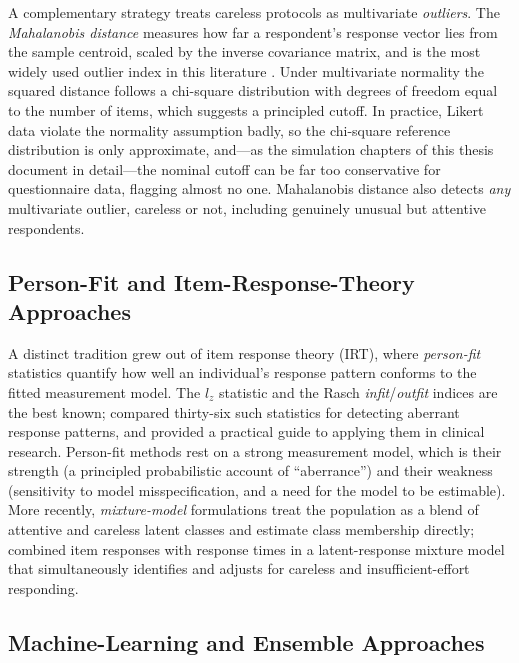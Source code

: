 A complementary strategy treats careless protocols as multivariate
\emph{outliers}. The \emph{Mahalanobis distance} \parencite{mahalanobis1936generalised}
measures how far a respondent's response vector lies from the sample centroid,
scaled by the inverse covariance matrix, and is the most widely used outlier
index in this literature \parencite{meade2012identifying, curran2016methods}.
Under multivariate normality the squared distance follows a chi-square
distribution with degrees of freedom equal to the number of items, which
suggests a principled cutoff. In practice, Likert data violate the normality
assumption badly, so the chi-square reference distribution is only approximate,
and---as the simulation chapters of this thesis document in detail---the
nominal cutoff can be far too conservative for questionnaire data, flagging
almost no one. Mahalanobis distance also detects \emph{any} multivariate
outlier, careless or not, including genuinely unusual but attentive respondents.

\subsection{Person-Fit and Item-Response-Theory Approaches}

A distinct tradition grew out of item response theory (IRT), where
\emph{person-fit} statistics quantify how well an individual's response pattern
conforms to the fitted measurement model. The $l_z$ statistic and the Rasch
\emph{infit}/\emph{outfit} indices are the best known; \textcite{karabatsos2003comparing}
compared thirty-six such statistics for detecting aberrant response patterns,
and \textcite{meijer2016practical} provided a practical guide to applying them
in clinical research. Person-fit methods rest on a strong measurement model,
which is their strength (a principled probabilistic account of ``aberrance'')
and their weakness (sensitivity to model misspecification, and a need for the
model to be estimable). More recently, \emph{mixture-model} formulations treat
the population as a blend of attentive and careless latent classes and estimate
class membership directly; \textcite{ulitzsch2022response} combined item
responses with response times in a latent-response mixture model that
simultaneously identifies and adjusts for careless and insufficient-effort
responding.

\subsection{Machine-Learning and Ensemble Approaches}

